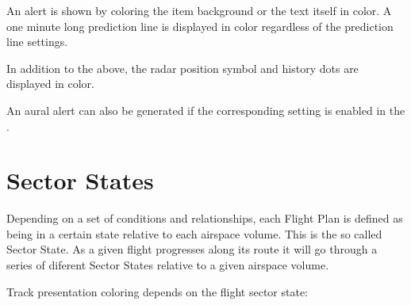 \documentclass[a4paper,oneside,11pt]{memoir}
\begin{document}
An alert is shown by coloring the  item background or the text itself in  color. A one minute long prediction line is displayed in  color regardless of the prediction line settings. 

\bigskip

In addition to the above, the radar position symbol and history dots are displayed in  color.

\bigskip

An aural alert can also be generated if the corresponding setting is enabled in the .

\section{Sector States}

Depending on a set of conditions and relationships, each Flight Plan is defined as being in a certain state relative to each airspace volume. This is the so called Sector State. As a given flight progresses along its route it will go through a series of diferent Sector States relative to a given airspace volume. 

\bigskip

Track presentation coloring depends on the flight sector state:
\end{document}
